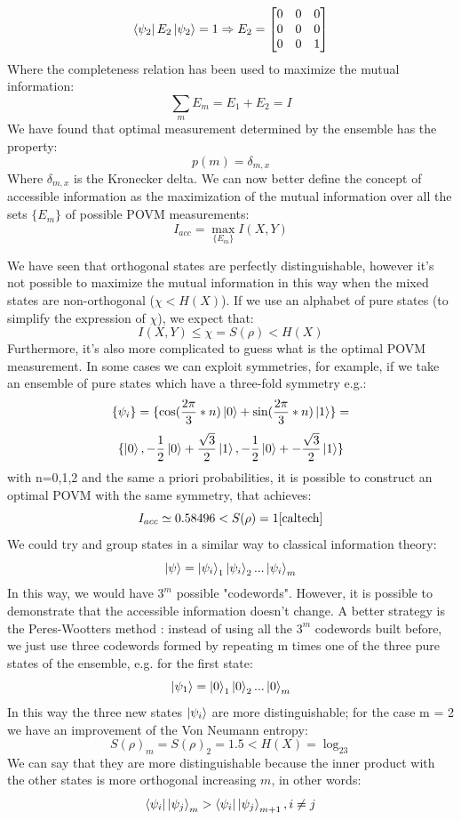 \documentclass[journal, letterpaper]{IEEEtran}
\begin{document}
  \[\bra{\psi_2}E_2\ket{\psi_2} = 1 \Rightarrow E_2 = \begin{bmatrix}
    0 & 0 & 0 \\
    0 & 0 & 0 \\
0 & 0 & 1
\end{bmatrix} \]
Where the completeness relation has been used to maximize the mutual information: 
\[ \sum_mE_m = E_1 + E_2 = I\]
We have found that optimal measurement determined by the ensemble has the property: 
\[p(m) = \delta_{m,x}\]
Where $\delta_{m,x}$ is the Kronecker delta. We can now better define the concept of accessible information as the maximization of the mutual information over all the sets $\{E_m\}$ of possible POVM measurements: 
\[I_{acc} = \max_{\{E_m\}}{I(X,Y)} \]

We have seen that orthogonal states are perfectly distinguishable, however it's not possible to maximize the mutual information in this way when the mixed states are non-orthogonal ($\chi <H(X)$). If we use an alphabet of pure states (to simplify the expression of $\chi$), we expect that: 
\[I(X,Y) \le \chi = S(\rho) < H(X)\]
Furthermore, it's also more complicated to guess what is the optimal POVM measurement.
In some cases we can exploit symmetries, for example, if we take an ensemble of pure states which have a three-fold symmetry e.g.: \\\[\{\psi_i\} =\{\cos(\frac{2\pi}{3}*n)\ket{0}+ \sin(\frac{2\pi}{3}*n)\ket{1}\} = \]\[\{\ket{0},-\frac{1}{2}\ket{0}+\frac{\sqrt{3}}{2}\ket{1},-\frac{1}{2}\ket{0}+-\frac{\sqrt{3}}{2}\ket{1}\}\]
with n=0,1,2 and the same a priori probabilities, it is possible to construct an optimal POVM with the same symmetry, that achieves: \[I_{acc} \simeq 0.58496 < S(\rho) = 1\cite{caltech}\] We could try and group states in a similar way to classical information theory: \[\ket{\psi} = \ket{\psi_i}_1\ket{\psi_i}_2...\ket{\psi_i}_m\]
In this way, we would have $3^m$ possible "codewords". However, it is possible to demonstrate that the accessible information doesn't change. A better strategy is the Peres-Wootters method \cite{peres}: instead of using all the $3^m$ codewords built before, we just use three codewords formed by repeating m times one of the three pure states of the ensemble, e.g. for the first state: 
\[\ket{\psi_1} = \ket{0}_1\ket{0}_2...\ket{0}_m\]
In this way the three new states $\ket{\psi_i}$ are more distinguishable; for the case m = 2 we have an improvement of the Von Neumann entropy: 
\[S(\rho)_{m} = S(\rho)_{2} = 1.5 < H(X) = \log_23 \]
We can say that they are more distinguishable because the inner product with the other states is more orthogonal increasing $m$, in other words:  \[\bra{\psi_i}\ket{\psi_j}_m>\bra{\psi_i}\ket{\psi_j}_{m+1},  i \neq j\]
\end{document}
